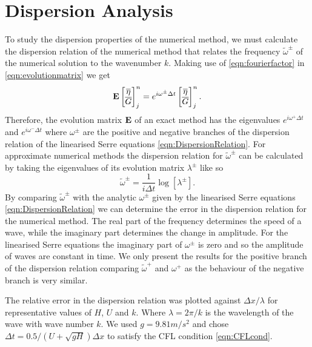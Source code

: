 \section{Dispersion Analysis}
To study the dispersion properties of the numerical method, we must calculate the dispersion relation of the numerical method that relates the frequency $\widetilde{\omega}^\pm$ of the numerical solution to the wavenumber $k$. Making use of \eqref{eqn:fourierfactor} in \eqref{eqn:evolutionmatrix} we get
\begin{equation*}\mathbf{E}\begin{bmatrix}
\overline{\eta} \\ \overline{G}
\end{bmatrix}^{n}_j = 
e^{i \omega^\pm \Delta t}\begin{bmatrix}
\overline{\eta} \\ \overline{G}
\end{bmatrix}^{n}_j.
\label{eqn:dispanalomeganum1}
\end{equation*}
Therefore, the evolution matrix $\mathbf{E}$ of an exact method has the eigenvalues $e^{i \omega^+ \Delta t}$ and $e^{i \omega^- \Delta t}$ where $\omega^\pm$ are the positive and negative branches of the dispersion relation of the linearised Serre equations \eqref{eqn:DispersionRelation}. For approximate numerical methods the dispersion relation for $\widetilde{\omega}^\pm$ can be calculated by taking the eigenvalues of its evolution matrix $\lambda^\pm$ like so
\begin{equation*}
\widetilde{\omega}^\pm = \frac{1}{i \Delta t} \log\left[ \lambda^\pm\right].
\end{equation*}
By comparing $\widetilde{\omega}^\pm$ with the analytic $\omega^\pm$ given by the linearised Serre equations \eqref{eqn:DispersionRelation} we can determine the error in the dispersion relation for the numerical method. The real part of the frequency determines the speed of a wave, while the imaginary part determines the change in amplitude. For the linearised Serre equations the imaginary part of $\omega^\pm$ is zero and so the amplitude of waves are constant in time. We only present the results for the positive branch of the dispersion relation comparing $\widetilde{\omega}^+$ and $\omega^+$ as the behaviour of the negative branch is very similar. 

The relative error in the dispersion relation was plotted against $\Delta x / \lambda$ for representative values of $H$, $U$ and $k$. Where $\lambda = 2 \pi / k$ is the wavelength of the wave with wave number $k$. We used $g = 9.81m/s^2$ and chose $\Delta t = 0.5 / \left(U + \sqrt{gH}\right) \Delta x$ to satisfy the CFL condition \eqref{eqn:CFLcond}.

